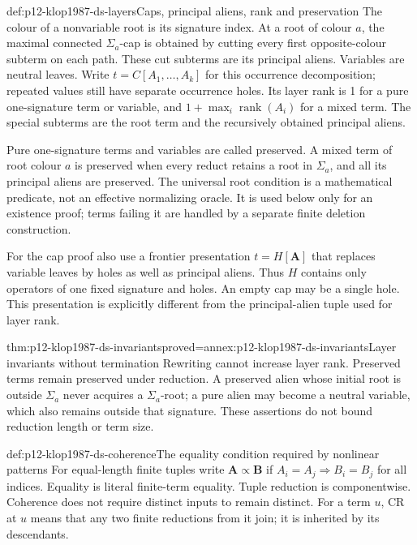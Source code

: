 \begin{hbdefinition}{def:p12-klop1987-ds-layers}{Caps, principal aliens, rank and preservation}
The colour of a nonvariable root is its signature index. At a root
of colour \(a\), the maximal connected \(\Sigma_a\)-cap is
obtained by cutting every first opposite-colour subterm on each
path. These cut subterms are its principal aliens. Variables are
neutral leaves. Write \(t=C[A_1,\ldots,A_k]\) for this occurrence
decomposition; repeated values still have separate occurrence holes.
Its layer rank is 1 for a pure one-signature term or variable, and
\(1+\max_i\operatorname{rank}(A_i)\) for a mixed term.
The special subterms are the root term and the recursively obtained
principal aliens.

Pure one-signature terms and variables are called preserved.
A mixed term of root colour \(a\) is preserved when every reduct
retains a root in \(\Sigma_a\), and all its principal aliens are
preserved. The universal root condition is a mathematical predicate,
not an effective normalizing oracle. It is used below only for an
existence proof; terms failing it are handled by a separate finite
deletion construction.

For the cap proof also use a frontier presentation \(t=H[\mathbf A]\)
that replaces variable leaves by holes as well as principal aliens.
Thus \(H\) contains only operators of one fixed signature and
holes. An empty cap may be a single hole. This presentation is
explicitly different from the principal-alien tuple used for layer rank.
\end{hbdefinition}

\begin{hblemma}{thm:p12-klop1987-ds-invariants}{proved=annex:p12-klop1987-ds-invariants}{Layer invariants without termination}
Rewriting cannot increase layer rank. Preserved terms remain
preserved under reduction. A preserved alien whose initial root
is outside \(\Sigma_a\) never acquires a \(\Sigma_a\)-root;
a pure alien may become a neutral variable, which also remains
outside that signature. These assertions do not bound reduction
length or term size.
\end{hblemma}

\begin{hbdefinition}{def:p12-klop1987-ds-coherence}{The equality condition required by nonlinear patterns}
For equal-length finite tuples write \(\mathbf A\propto\mathbf B\)
if \(A_i=A_j\Rightarrow B_i=B_j\) for all indices. Equality
is literal finite-term equality. Tuple reduction is componentwise.
Coherence does not require distinct inputs to remain distinct.
For a term \(u\), CR at \(u\) means that any two finite
reductions from it join; it is inherited by its descendants.
\end{hbdefinition}

